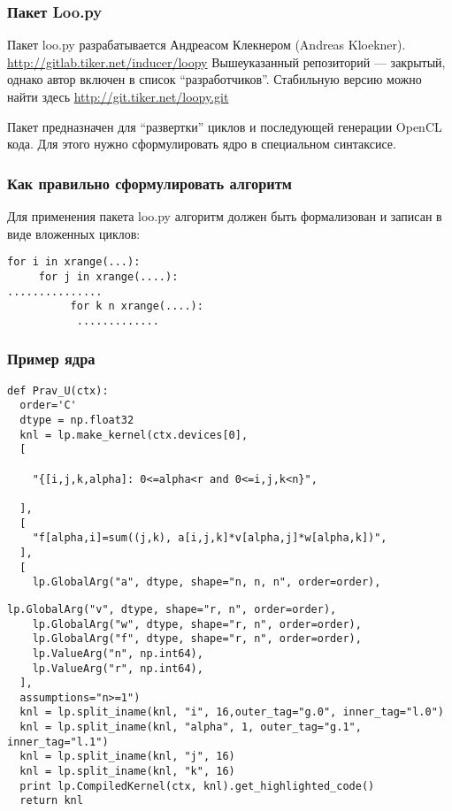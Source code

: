 \documentclass[presentation]{beamer}
\begin{document}
\begin{frame}
\frametitle{Пакет Loo.py}
\label{sec-1-6}

Пакет loo.py разрабатывается Андреасом Клекнером (Andreas Kloekner).
\href{http://gitlab.tiker.net/inducer/loopy}{http://gitlab.tiker.net/inducer/loopy} 
Вышеуказанный репозиторий --- закрытый, однако автор включен в список ``разработчиков''.
Стабильную версию можно найти здесь \href{http://git.tiker.net/loopy.git}{http://git.tiker.net/loopy.git}

Пакет предназначен для ``развертки'' циклов и последующей генерации OpenCL кода.
Для этого нужно сформулировать ядро в специальном синтаксисе.
\end{frame}
\begin{frame}[fragile]
\frametitle{Как правильно сформулировать алгоритм}
\label{sec-1-7}

Для применения пакета loo.py алгоритм должен быть формализован и записан в виде
вложенных циклов:

\begin{verbatim}
for i in xrange(...):
     for j in xrange(....):
...............
          for k n xrange(....):
           .............
\end{verbatim}
\end{frame}
\begin{frame}[fragile]
\frametitle{Пример ядра}
\label{sec-1-8}


\begin{verbatim}
def Prav_U(ctx):
  order='C'
  dtype = np.float32
  knl = lp.make_kernel(ctx.devices[0], 
  [

    "{[i,j,k,alpha]: 0<=alpha<r and 0<=i,j,k<n}",

  ],
  [
    "f[alpha,i]=sum((j,k), a[i,j,k]*v[alpha,j]*w[alpha,k])",
  ],
  [
    lp.GlobalArg("a", dtype, shape="n, n, n", order=order),
\end{verbatim}
\end{frame}
\begin{frame}[fragile]


\begin{verbatim}
lp.GlobalArg("v", dtype, shape="r, n", order=order),
    lp.GlobalArg("w", dtype, shape="r, n", order=order),
    lp.GlobalArg("f", dtype, shape="r, n", order=order),
    lp.ValueArg("n", np.int64),
    lp.ValueArg("r", np.int64),
  ],
  assumptions="n>=1")
  knl = lp.split_iname(knl, "i", 16,outer_tag="g.0", inner_tag="l.0")
  knl = lp.split_iname(knl, "alpha", 1, outer_tag="g.1", inner_tag="l.1")
  knl = lp.split_iname(knl, "j", 16)
  knl = lp.split_iname(knl, "k", 16)
  print lp.CompiledKernel(ctx, knl).get_highlighted_code()   
  return knl
\end{verbatim}
\end{frame}
\end{document}
